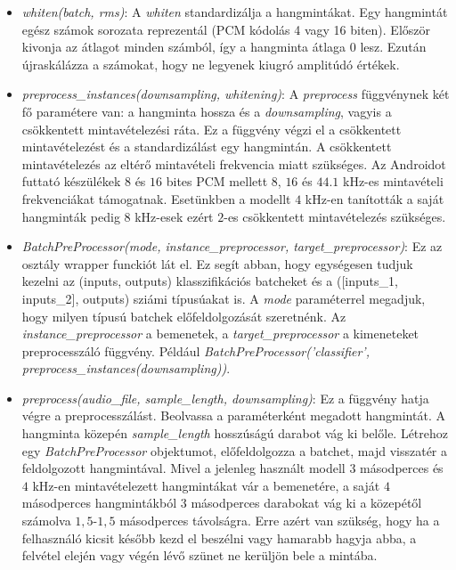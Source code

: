 \begin{itemize}
		\begin{itemize}
		\item \emph{whiten(batch, rms)}: A \emph{whiten} standardizálja a hangmintákat. Egy hangmintát egész számok sorozata reprezentál (PCM kódolás 4 vagy 16 biten). Először kivonja az átlagot minden számból, így a hangminta átlaga 0 lesz. Ezután újraskálázza a számokat, hogy ne legyenek kiugró amplitúdó értékek.
		\newline
		\item \emph{preprocess\_instances(downsampling, whitening)}: A \emph{preprocess} függvénynek két fő paramétere van: a hangminta hossza és a \emph{downsampling}, vagyis a csökkentett mintavételezési ráta. Ez a függvény végzi el a csökkentett mintavételezést és a standardizálást egy hangmintán.
		\newline
		\newline
		A csökkentett mintavételezés az eltérő mintavételi frekvencia miatt szükséges. Az Androidot futtató készülékek $8$ és $16$ bites PCM mellett $8$, $16$ és $44.1$ kHz-es mintavételi frekvenciákat támogatnak. Esetünkben a modellt $4$ kHz-en tanították a saját hangminták pedig $8$ kHz-esek ezért $2$-es csökkentett mintavételezés szükséges.
		\newline
		\item \emph{BatchPreProcessor(mode, instance\_preprocessor, target\_preprocessor)}: Ez az osztály wrapper funckiót lát el. Ez segít abban, hogy egységesen tudjuk kezelni az (inputs, outputs) klasszifikációs batcheket és a ([inputs\_1, inputs\_2], outputs) sziámi típusúakat is. A \emph{mode} paraméterrel megadjuk, hogy milyen típusú batchek előfeldolgozását szeretnénk. Az \emph{instance\_preprocessor} a bemenetek, a \emph{target\_preprocessor} a kimeneteket preprocesszáló függvény. Például \emph{BatchPreProcessor('classifier', preprocess\_instances(downsampling))}.
		\newline
		\item \emph{preprocess(audio\_file, sample\_length, downsampling)}: 
		Ez a függvény hatja végre a preprocesszálást. Beolvassa a paraméterként megadott hangmintát. A hangminta közepén \emph{sample\_length} hosszúságú darabot vág ki belőle. Létrehoz egy \emph{BatchPreProcessor} objektumot, előfeldolgozza a batchet, majd visszatér a feldolgozott hangmintával.
		\newline
		\newline
		Mivel a jelenleg használt modell $3$ másodperces és $4$ kHz-en mintavételezett hangmintákat vár a bemenetére, a saját $4$ másodperces hangmintákból $3$ másodperces darabokat vág ki a közepétől számolva $1,5$-$1,5$ másodperces távolságra. Erre azért van szükség, hogy ha a felhasználó kicsit később kezd el beszélni vagy hamarabb hagyja abba, a felvétel elején vagy végén lévő szünet ne kerüljön bele a mintába.
		\end{itemize}
\end{itemize}

